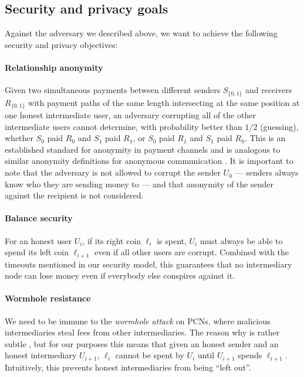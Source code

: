 \documentclass[USenglish,oneside,twocolumn]{article}
\begin{document}
\subsection{Security and privacy goals} \label{secprivgoals}

Against the adversary we described above, we want to achieve the following security and privacy objectives:

\paragraph*{Relationship anonymity}

Given two simultaneous payments between different senders $S_{\{ 0,1 \}}$ and receivers $R_{\{ 0,1\} }$ with payment paths of the same length intersecting at the same position at one honest intermediate user, an adversary corrupting all of the other intermediate users cannot determine, with probability better than $1/2$ (guessing), whether $S_0$ paid $R_0$ and $S_1$ paid $R_1$, or $S_0$ paid $R_1$ and $S_1$ paid $R_0$. This is an established standard for anonymity in payment channels \cite{malavolta2017concurrency,malavolta2019anonymous} and is analogous to similar anonymity definitions for anonymous communication \cite{pfitzmann2010terminology, backes2013anoa}. It is important to note that the adversary is not allowed to corrupt the sender $U_0$ --- senders always know who they are sending money to --- and that anonymity of the sender against the recipient is not considered.

\paragraph*{Balance security}

For an honest user $U_i$, if its right coin $\ell_i$ is spent, $U_i$ must always be able to spend its left coin $\ell_{i+1}$ even if all other users are corrupt. Combined with the timeouts mentioned in our security model, this guarantees that no intermediary node can lose money even if everybody else conspires against it.

\paragraph*{Wormhole resistance}

We need to be immune to the \emph{wormhole attack} on PCNs, where malicious intermediaries steal fees from other intermediaries. The reason why is rather subtle \cite{malavolta2019anonymous}, but for our purposes this means that given an honest sender and an honest intermediary $U_{i+1}$, $\ell_i$ cannot be spent by $U_i$ until $U_{i+1}$ spends $\ell_{i+1}$.  Intuitively, this prevents honest intermediaries from being ``left out''.
\end{document}
